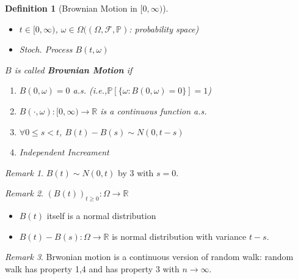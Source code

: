 \documentclass[12pt]{report}
\newcommand{\R}{\mathbb{R}}
\renewcommand{\P}{\mathbb{P}}
\newcommand{\F}{\mathcal{F}}
\renewcommand{\1}{\mathbb{1}}
\renewcommand{\O}{\Omega}
\theoremstyle{break}
\theoremstyle{newdef}
\newtheorem{defn}[thm]{Definition} %
\theoremstyle{remark}
\newtheorem*{rem}{Remark} %
\begin{document}
\begin{defn}[Brownian Motion in $[0,\infty)$]
\leavevmode
\vspace{-6mm}
\begin{itemize}
\item $t \in [0,\infty)$, $\omega \in \O((\O,\F,\P)$: probability space)
\item Stoch. Process $B(t,\omega)$
\end{itemize}
$B$ is called \textbf{Brownian Motion} if
\begin{enumerate}
\item $B(0,\omega) = 0$ a.s. (i.e.,$\P\left[\{\omega: B(0,\omega) = 0\}\right]=1$)
\item $B(\cdot, \omega) : [0,\infty) \rightarrow \R$ is a continuous function a.s.
\item $\forall 0 \leq s < t$, $B(t) - B(s) \sim N(0,t-s)$
\item Independent Increament
\end{enumerate}
\end{defn}

\begin{rem}
$B(t) \sim N(0,t)$ by 3 with $s=0$.
\end{rem}


\begin{rem}
$(B(t))_{t\geq 0} : \O \rightarrow \R$
\begin{itemize}
\item $B(t)$ itself is a normal distribution
\item $B(t) - B(s) : \O \rightarrow \R$ is normal distribution with variance $t-s$.
\end{itemize}
\end{rem}

\begin{rem}
Brwonian motion is a continuous version of random walk: random walk has property 1,4 and has property 3 with $n\rightarrow\infty$.
\end{rem}
\end{document}
